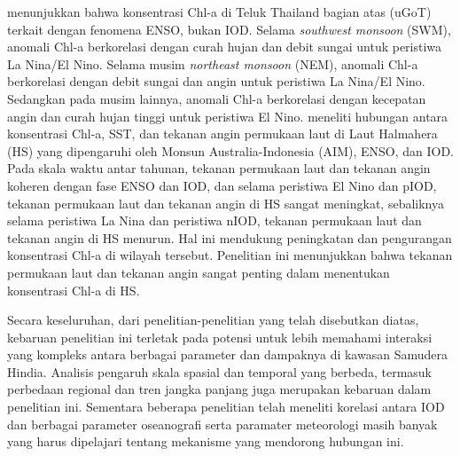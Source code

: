 \begin{spacing}{1.5}
	 menunjukkan bahwa konsentrasi Chl-a di Teluk Thailand bagian atas (uGoT) terkait dengan fenomena ENSO, bukan IOD. Selama \textit{southwest monsoon} (SWM), anomali Chl-a berkorelasi dengan curah hujan dan debit sungai untuk peristiwa La Nina/El Nino. Selama musim \textit{northeast monsoon} (NEM), anomali Chl-a berkorelasi dengan debit sungai dan angin untuk peristiwa La Nina/El Nino. Sedangkan pada musim lainnya, anomali Chl-a berkorelasi dengan kecepatan angin dan curah hujan tinggi untuk peristiwa El Nino.  meneliti hubungan antara konsentrasi Chl-a, SST, dan tekanan angin permukaan laut di Laut Halmahera (HS) yang dipengaruhi oleh Monsun Australia-Indonesia (AIM), ENSO, dan IOD. Pada skala waktu antar tahunan, tekanan permukaan laut dan tekanan angin koheren dengan fase ENSO dan IOD, dan selama peristiwa El Nino dan pIOD, tekanan permukaan laut dan tekanan angin di HS sangat meningkat, sebaliknya selama peristiwa La Nina dan peristiwa nIOD, tekanan permukaan laut dan tekanan angin  di HS menurun. Hal ini mendukung peningkatan dan pengurangan konsentrasi Chl-a di wilayah tersebut. Penelitian ini menunjukkan bahwa tekanan permukaan laut dan tekanan angin sangat penting dalam menentukan konsentrasi Chl-a di HS.
	
	Secara keseluruhan, dari penelitian-penelitian yang telah disebutkan diatas, kebaruan penelitian ini terletak pada potensi untuk lebih memahami interaksi yang kompleks antara berbagai parameter dan dampaknya di kawasan Samudera Hindia. Analisis pengaruh skala spasial dan temporal yang berbeda, termasuk perbedaan regional dan tren jangka panjang juga merupakan kebaruan dalam penelitian ini. Sementara beberapa penelitian telah meneliti korelasi antara IOD dan berbagai parameter oseanografi serta paramater meteorologi masih banyak yang harus dipelajari tentang mekanisme yang mendorong hubungan ini.
	
\end{spacing}
\vspace{-1pc}
